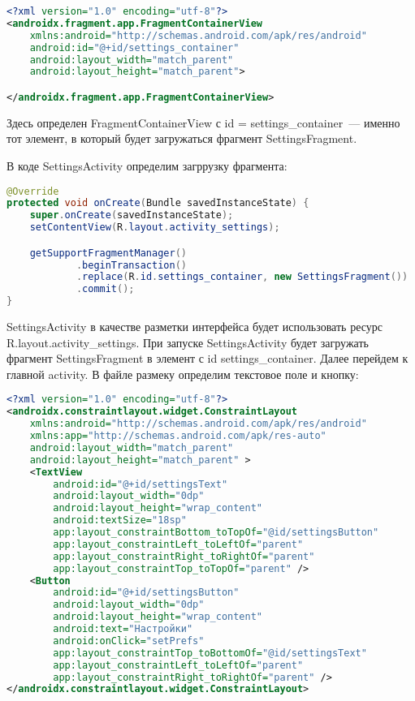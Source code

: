 \begin{lstlisting}[language=XML
	, label=lst:
	]
<?xml version="1.0" encoding="utf-8"?>
<androidx.fragment.app.FragmentContainerView
    xmlns:android="http://schemas.android.com/apk/res/android"
    android:id="@+id/settings_container"
    android:layout_width="match_parent"
    android:layout_height="match_parent">

</androidx.fragment.app.FragmentContainerView>
\end{lstlisting}

Здесь определен FragmentContainerView с id = settings\_container~---
именно тот элемент, в который будет загружаться
фрагмент SettingsFragment.\par
В коде SettingsActivity определим загррузку фрагмента:

\begin{lstlisting}[language=Java
	, label=lst:
	]
@Override
protected void onCreate(Bundle savedInstanceState) {
	super.onCreate(savedInstanceState);
	setContentView(R.layout.activity_settings);

	getSupportFragmentManager()
			.beginTransaction()
			.replace(R.id.settings_container, new SettingsFragment())
			.commit();
}
\end{lstlisting}

SettingsActivity в качестве разметки интерфейса будет использовать ресурс
R.layout.activity\_settings.
При запуске SettingsActivity будет загружать фрагмент SettingsFragment в
элемент с id settings\_container.
Далее перейдем к главной activity. В файле размеку
определим текстовое поле и кнопку:

\begin{lstlisting}[language=XML
	, label=lst:
	]
<?xml version="1.0" encoding="utf-8"?>
<androidx.constraintlayout.widget.ConstraintLayout
    xmlns:android="http://schemas.android.com/apk/res/android"
    xmlns:app="http://schemas.android.com/apk/res-auto"
    android:layout_width="match_parent"
    android:layout_height="match_parent" >
    <TextView
        android:id="@+id/settingsText"
        android:layout_width="0dp"
        android:layout_height="wrap_content"
        android:textSize="18sp"
        app:layout_constraintBottom_toTopOf="@id/settingsButton"
        app:layout_constraintLeft_toLeftOf="parent"
        app:layout_constraintRight_toRightOf="parent"
        app:layout_constraintTop_toTopOf="parent" />
    <Button
        android:id="@+id/settingsButton"
        android:layout_width="0dp"
        android:layout_height="wrap_content"
        android:text="Настройки"
        android:onClick="setPrefs"
        app:layout_constraintTop_toBottomOf="@id/settingsText"
        app:layout_constraintLeft_toLeftOf="parent"
        app:layout_constraintRight_toRightOf="parent" />
</androidx.constraintlayout.widget.ConstraintLayout>
\end{lstlisting}

